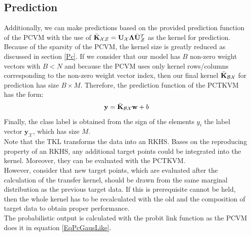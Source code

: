 \subsection{Prediction}\label{InSubSecPrediction}
Additionally, we can make predictions based on the provided prediction function of the \acs{PCVM} with the use of $\bar{\mathbf{K}}_\mathcal{XZ} = \mathbf{U}_\mathcal{X}\mathbf{\Lambda}\bar{\mathbf{U}}_\mathcal{Z}^T$ as the kernel for prediction.\cite{Long.2015}\\
Because of the sparsity of the \acs{PCVM}, the kernel size is greatly reduced as discussed in section \ref{Pc}.
If we consider that our model has $B$ non-zero weight vectors with $B < N$ and because the \acs{PCVM} uses only kernel rows/columns corresponding to the non-zero weight vector index, then our final kernel $\bar{\mathbf{K}}_\mathcal{BX}$ for prediction has size $B\times M$.
Therefore, the prediction function of the \acs{PCTKVM} has the form:
\begin{equation}
\mathbf{y} = \bar{\mathbf{K}}_\mathcal{BX}\mathbf{w}+b
\end{equation}
Finally, the class label is obtained from the sign of the elements $y_i$ the label vector $\mathbf{y}_\mathcal{X}$, which has size $M$.\\
Note that the \acs{TKL} transforms the data into an \acs{RKHS}.
Bases on the reproducing property of an \acs{RKHS}, any additional target points could be integrated into the kernel.\cite{Long.2015}
Moreover, they can be evaluated with the \acs{PCTKVM}.\\
However, consider that new target points, which are evaluated after the calculation of the transfer kernel, should be drawn from the same marginal distribution as the previous target data. 
If this is prerequisite cannot be held, then the whole kernel has to be recalculated with the old and the composition of target data to obtain proper performance.\\
The probabilistic output is calculated with the probit link function as the \acs{PCVM} does it in equation \ref{EqPcGausLike}.

